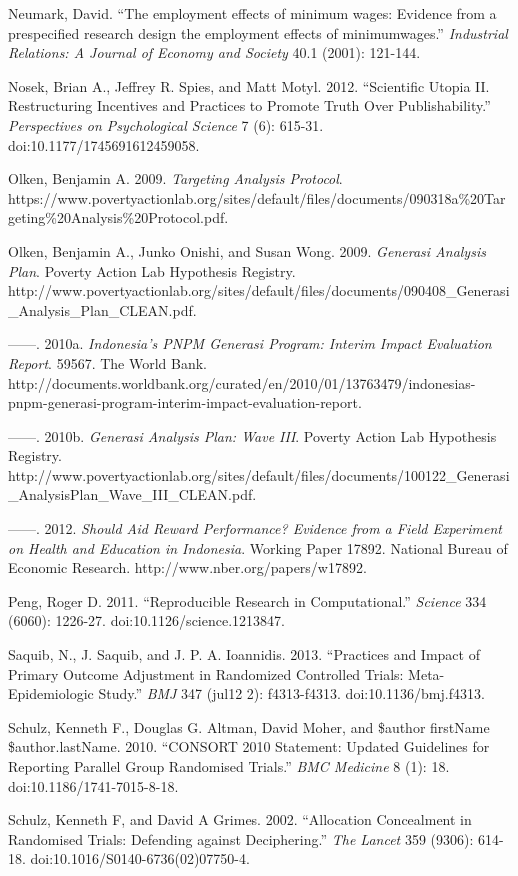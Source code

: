 \documentclass[12pt] {article}
\begin{document}
Neumark, David. ``The employment effects of minimum wages: Evidence from
a prespecified research design the employment effects of minimumwages.''
\emph{Industrial Relations: A Journal of Economy and Society} 40.1
(2001): 121-144.

Nosek, Brian A., Jeffrey R. Spies, and Matt Motyl. 2012. ``Scientific
Utopia II. Restructuring Incentives and Practices to Promote Truth Over
Publishability.'' \emph{Perspectives on Psychological Science} 7 (6):
615-31. doi:10.1177/1745691612459058.

Olken, Benjamin A. 2009. \emph{Targeting Analysis Protocol}.
https://www.povertyactionlab.org/sites/default/files/documents/090318a\%20Targeting\%20Analysis\%20Protocol.pdf.

Olken, Benjamin A., Junko Onishi, and Susan Wong. 2009. \emph{Generasi
Analysis Plan}. Poverty Action Lab Hypothesis Registry.
http://www.povertyactionlab.org/sites/default/files/documents/090408\_Generasi\_Analysis\_Plan\_CLEAN.pdf.

------. 2010a. \emph{Indonesia's PNPM Generasi Program: Interim Impact
Evaluation Report}. 59567. The World Bank.
http://documents.worldbank.org/curated/en/2010/01/13763479/indonesias-pnpm-generasi-program-interim-impact-evaluation-report.

------. 2010b. \emph{Generasi Analysis Plan: Wave III}. Poverty Action
Lab Hypothesis Registry.
http://www.povertyactionlab.org/sites/default/files/documents/100122\_Generasi\_AnalysisPlan\_Wave\_III\_CLEAN.pdf.

------. 2012. \emph{Should Aid Reward Performance? Evidence from a Field
Experiment on Health and Education in Indonesia}. Working Paper 17892.
National Bureau of Economic Research. http://www.nber.org/papers/w17892.

Peng, Roger D. 2011. ``Reproducible Research in Computational.''
\emph{Science} 334 (6060): 1226-27. doi:10.1126/science.1213847.

Saquib, N., J. Saquib, and J. P. A. Ioannidis. 2013. ``Practices and
Impact of Primary Outcome Adjustment in Randomized Controlled Trials:
Meta-Epidemiologic Study.'' \emph{BMJ} 347 (jul12 2): f4313-f4313.
doi:10.1136/bmj.f4313.

Schulz, Kenneth F., Douglas G. Altman, David Moher, and \$author
firstName \$author.lastName. 2010. ``CONSORT 2010 Statement: Updated
Guidelines for Reporting Parallel Group Randomised Trials.'' \emph{BMC
Medicine} 8 (1): 18. doi:10.1186/1741-7015-8-18.

Schulz, Kenneth F, and David A Grimes. 2002. ``Allocation Concealment in
Randomised Trials: Defending against Deciphering.'' \emph{The Lancet}
359 (9306): 614-18. doi:10.1016/S0140-6736(02)07750-4.
\end{document}
